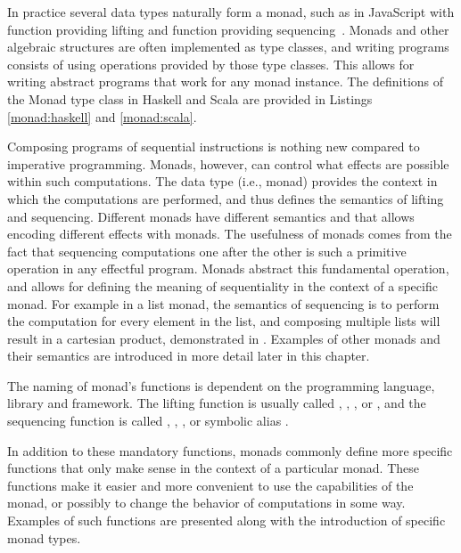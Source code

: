 In practice several data types naturally form a monad, such as  in JavaScript with  function providing lifting and  function providing sequencing~\cite{js-array}. Monads and other algebraic structures are often implemented as type classes, and writing programs consists of using operations provided by those type classes. This allows for writing abstract programs that work for any monad instance. The definitions of the Monad type class in Haskell and Scala are provided in Listings \ref{monad:haskell} and \ref{monad:scala}.





Composing programs of sequential instructions is nothing new compared to imperative programming. Monads, however, can control what effects are possible within such computations. The data type (i.e., monad) provides the context in which the computations are performed, and thus defines the semantics of lifting and sequencing. Different monads have different semantics and that allows encoding different effects with monads. The usefulness of monads comes from the fact that sequencing computations one after the other is such a primitive operation in any effectful program. Monads abstract this fundamental operation, and allows for defining the meaning of sequentiality in the context of a specific monad. For example in a list monad, the semantics of sequencing is to perform the computation for every element in the list, and composing multiple lists will result in a cartesian product, demonstrated in . Examples of other monads and their semantics are introduced in more detail later in this chapter.



The naming of monad's functions is dependent on the programming language, library and framework. The lifting function is usually called , , , or , and the sequencing function is called , , , or symbolic alias \inlinecode{>>=}.

In addition to these mandatory functions, monads commonly define more specific functions that only make sense in the context of a particular monad. These functions make it easier and more convenient to use the capabilities of the monad, or possibly to change the behavior of computations in some way. Examples of such functions are presented along with the introduction of specific monad types.


